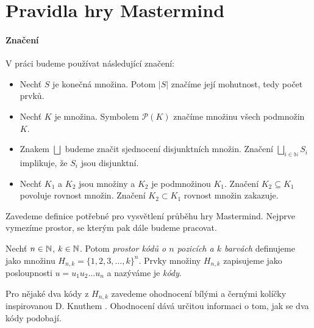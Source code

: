 \chapter{Pravidla hry Mastermind}

\subsubsection{Značení}
V práci budeme používat následující značení:
\begin{itemize}
    \item Nechť $S$ je konečná množina. Potom $|S|$ značíme její mohutnost, tedy počet prvků.
    \item Nechť $K$ je množina. Symbolem $\mathcal{P}(K)$ značíme množinu všech podmnožin~$K$.
    \item Znakem $\bigsqcup$ budeme značit sjednocení disjunktních množin. Značení $\bigsqcup_{i\in \mathbb{N}} S_i$ implikuje, že $S_i$ jsou disjunktní. 
    \item Nechť $K_1$ a $K_2$ jsou množiny a $K_2$ je podmnožinou $K_1$. Značení $K_2 \subseteq K_1$ povoluje rovnost množin. Značení $K_2 \subset K_1$ rovnost množin zakazuje.
\end{itemize}

Zavedeme definice potřebné pro vysvětlení průběhu hry Mastermind. Nejprve vymezíme prostor, se kterým pak dále budeme pracovat. 

\begin{definice}\label{def01:1}
  Nechť $n \in \mathbb{N} $, $k \in \mathbb{N} $. Potom \emph{prostor kódů o $n$ pozicích a $k$ barvách} definujeme jako množinu $H_{n,k} = \{1, 2, 3, \dots, k\}^n$. Prvky množiny $H_{n,k}$ zapisujeme jako posloupnosti $u = u_1u_2\dots u_n$ a nazýváme je \emph{kódy}.
\end{definice}


Pro nějaké dva kódy z $H_{n,k}$ zavedeme ohodnocení bílými a černými kolíčky inspirovanou D. Knuthem \cite{donald_e__knuth_1977}. Ohodnocení dává určitou informaci o tom, jak se dva kódy podobají.


